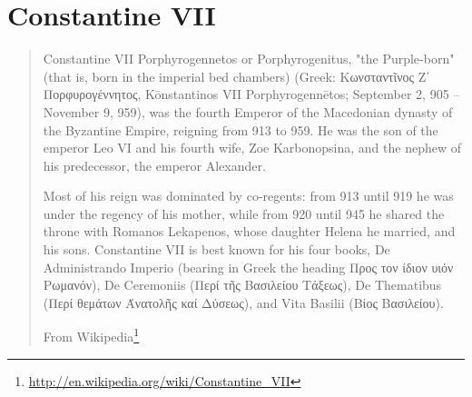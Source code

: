 \documentclass[12pt,letterpaper,twoside,final]{memoir}
\begin{document}
\section{Constantine VII}
\blockquote[From Wikipedia\footnote{\url{http://en.wikipedia.org/wiki/Constantine_VII}}]{Constantine VII Porphyrogennetos or Porphyrogenitus, "the Purple-born" (that is, born in the imperial bed chambers) (Greek: Κωνσταντῖνος Ζ΄ Πορφυρογέννητος, Kōnstantinos VII Porphyrogennētos; September 2, 905 – November 9, 959), was the fourth Emperor of the Macedonian dynasty of the Byzantine Empire, reigning from 913 to 959. He was the son of the emperor Leo VI and his fourth wife, Zoe Karbonopsina, and the nephew of his predecessor, the emperor Alexander.

Most of his reign was dominated by co-regents: from 913 until 919 he was under the regency of his mother, while from 920 until 945 he shared the throne with Romanos Lekapenos, whose daughter Helena he married, and his sons. Constantine VII is best known for his four books, De Administrando Imperio (bearing in Greek the heading Προς τον ίδιον υιόν Ρωμανόν), De Ceremoniis (Περί τῆς Βασιλείου Τάξεως), De Thematibus (Περί θεμάτων Άνατολῆς καί Δύσεως), and Vita Basilii (Βίος Βασιλείου).}
\end{document}
